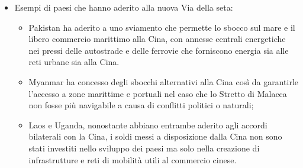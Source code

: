 \documentclass{article}
\begin{document}
\begin{itemize}
    \item Esempi di paesi che hanno aderito alla nuova Via della seta:
    \begin{itemize}
        \item Pakistan ha aderito a uno sviamento che permette lo sbocco sul mare e il libero
            commercio marittimo alla Cina, con annesse centrali energetiche nei pressi delle
            autostrade e delle ferrovie che forniscono energia sia alle reti urbane sia alla
            Cina.
        \item Myanmar ha concesso degli sbocchi alternativi alla Cina così da garantirle
            l'accesso a zone marittime e portuali nel caso che lo Stretto di Malacca non fosse
            più navigabile a causa di conflitti politici o naturali;
        \item Laos e Uganda, nonostante abbiano entrambe aderito agli accordi bilaterali con
            la Cina, i soldi messi a disposizione dalla Cina non sono stati investiti nello
            sviluppo dei paesi ma solo nella creazione di infrastrutture e reti di mobilità
            utili al commercio cinese.
    \end{itemize}
\end{itemize}
\end{document}
